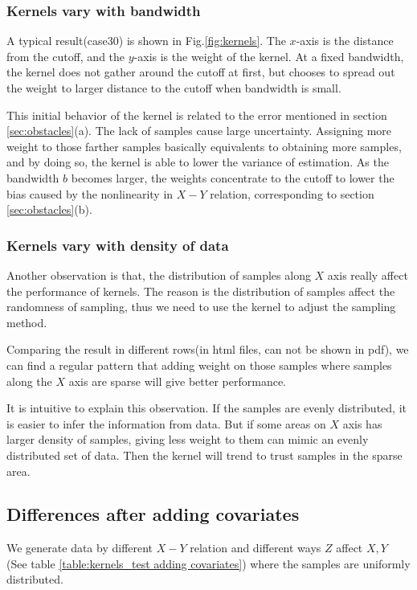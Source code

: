 \documentclass[a4 paper,12pt]{article}
\begin{document}
\subsubsection*{Kernels vary with bandwidth}

A typical result(case30) is shown in Fig.\ref{fig:kernels}. The $x$-axis is the distance from the cutoff, and the $y$-axis is the weight of the kernel. At a fixed bandwidth, the kernel does not gather around the cutoff at first, but chooses to spread out the weight to larger distance to the cutoff when bandwidth is small.

This initial behavior of the kernel is related to the error mentioned in section \ref{sec:obstacles}(a). The lack of samples cause large uncertainty. Assigning more weight to those farther samples basically equivalents to obtaining more samples, and by doing so, the kernel is able to lower the variance of estimation. As the bandwidth $b$ becomes larger, the weights concentrate to the cutoff to lower the bias caused by the nonlinearity in $X-Y$ relation, corresponding to section \ref{sec:obstacles}(b).

\subsubsection*{Kernels vary with density of data}

Another observation is that, the distribution of samples along $X$ axis really affect the performance of kernels. The reason is the distribution of samples affect the randomness of sampling, thus we need to use the kernel to adjust the sampling method.

Comparing the result in different rows(in html files, can not be shown in pdf), we can find a regular pattern that adding weight on those samples where samples along the $X$ axis are sparse will give better performance. 

It is intuitive to explain this observation. If the samples are evenly distributed, it is easier to infer the information from data. But if some areas on $X$ axis has larger density of samples, giving less weight to them can mimic an evenly distributed set of data. Then the kernel will trend to trust samples in the sparse area.

\subsection{Differences after adding covariates}
We generate data by different $X-Y$ relation and different ways $Z$ affect $X,Y$ (See table \ref{table:kernels_test adding covariates}) where the samples are uniformly distributed.
\end{document}
